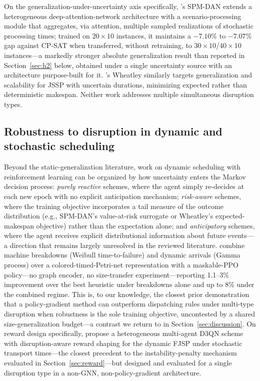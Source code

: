 \documentclass[11pt]{article}
\begin{document}
On the generalization-under-uncertainty axis specifically, \citet{smit2025spmdan}'s SPM-DAN extends a heterogeneous deep-attention-network architecture with a scenario-processing module that aggregates, via attention, multiple sampled realizations of stochastic processing times; trained on $20\times10$ instances, it maintains a $-7.10\%$ to $-7.07\%$ gap against CP-SAT when transferred, without retraining, to $30\times10$/$40\times10$ instances---a markedly stronger absolute generalization result than reported in Section~\ref{sec:h2} below, obtained under a single uncertainty source with an architecture purpose-built for it. \citet{infantes2024wheatley}'s Wheatley similarly targets generalization and scalability for JSSP with uncertain durations, minimizing expected rather than deterministic makespan. Neither work addresses multiple simultaneous disruption types.

\subsection{Robustness to disruption in dynamic and stochastic scheduling}

Beyond the static-generalization literature, work on dynamic scheduling with reinforcement learning can be organized by how uncertainty enters the Markov decision process: \emph{purely reactive} schemes, where the agent simply re-decides at each new epoch with no explicit anticipation mechanism; \emph{risk-aware} schemes, where the training objective incorporates a tail measure of the outcome distribution (e.g., SPM-DAN's value-at-risk surrogate or Wheatley's expected-makespan objective) rather than the expectation alone; and \emph{anticipatory} schemes, where the agent receives explicit distributional information about future events---a direction that remains largely unresolved in the reviewed literature. \citet{lassoued2026} combine machine breakdowns (Weibull time-to-failure) and dynamic arrivals (Gamma process) over a colored-timed-Petri-net representation with a maskable-PPO policy---no graph encoder, no size-transfer experiment---reporting 1.1--3\% improvement over the best heuristic under breakdowns alone and up to 8\% under the combined regime. This is, to our knowledge, the closest prior demonstration that a policy-gradient method can outperform dispatching rules under multi-type disruption when robustness is the sole training objective, uncontested by a shared size-generalization budget---a contrast we return to in Section~\ref{sec:discussion}. On reward design specifically, \citet{zhang2024rewardshaping} propose a heterogeneous multi-agent D3QN scheme with disruption-aware reward shaping for the dynamic FJSP under stochastic transport times---the closest precedent to the instability-penalty mechanism evaluated in Section~\ref{sec:reward}---but designed and evaluated for a single disruption type in a non-GNN, non-policy-gradient architecture.
\end{document}
